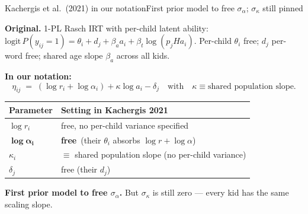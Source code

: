 \documentclass[aspectratio=169,t]{beamer}
\renewcommand{\arraystretch}{1.10}
\begin{document}
\begin{frame}{Kachergis et al.\ (2021) in our notation}{First prior model to free $\sigma_\alpha$; $\sigma_\kappa$ still pinned}

\small
\textbf{Original.} 1-PL Rasch IRT with per-child latent ability:
$\mathrm{logit}\,P(y_{ij}=1) = \theta_i + d_j + \beta_a a_i + \beta_t \log(p_j H a_i)$.
Per-child $\theta_i$ free; $d_j$ per-word free; shared age slope $\beta_a$
across all kids.

\vspace{0.6em}
\centering
\textbf{In our notation:}
\[
\eta_{ij} \;=\; (\log r_i + \log\alpha_i) + \kappa \log a_i - \delta_j
\quad\text{with}\quad \kappa \equiv \text{shared population slope}.
\]

\vspace{0.4em}
\renewcommand{\arraystretch}{1.20}
\begin{tabular}{@{}ll@{}}
\toprule
\textbf{Parameter} & \textbf{Setting in Kachergis 2021} \\
\midrule
$\log r_i$         & free, no per-child variance specified \\
$\boldsymbol{\log\alpha_i}$ & \textbf{free} \,(their $\theta_i$ absorbs $\log r + \log\alpha$) \\
$\kappa_i$         & $\equiv$ shared population slope (no per-child variance) \\
$\delta_j$         & free (their $d_j$) \\
\bottomrule
\end{tabular}

\vspace{0.6em}
\textbf{First prior model to free $\sigma_\alpha$.} But $\sigma_\kappa$
is still zero --- every kid has the same scaling slope.

\end{frame}
\end{document}
